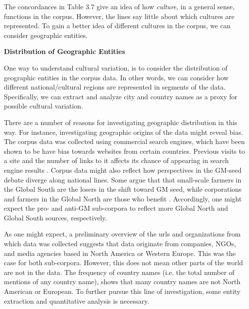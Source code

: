 The concordances in Table 3.7 give an idea of how \textit{culture}, in a general sense, functions in the corpus. However, the lines say little about which cultures are represented. To gain a better idea of different cultures in the corpus, we can consider geographic entities.  

\textbf{Distribution of Geographic Entities}

One way to understand cultural variation, is to consider the distribution of geographic entities in the corpus data. In other words, we can consider how different national/cultural regions are represented in segments of the data. Specifically, we can extract and analyze city and country names as a proxy for possible cultural variation. 

There are a number of reasons for investigating geographic distribution in this way. For instance, investigating geographic origins of the data might reveal bias. The corpus data was collected using commercial search engines, which have been shown to be have bias towards websites from certain countries. Previous visits to a site and the number of links to it affects its chance of appearing in search engine results \citep{Vaughan2013a}. Corpus data might also reflect how perspectives in the GM-seed debate diverge along national lines. Some argue that that small-scale farmers in the Global South are the losers in the shift toward GM seed, while corporations and farmers in the Global North are those who benefit \citep{Parfitt2013a, Nu2009a}. Accordingly, one might expect the pro- and anti-GM sub-corpora to reflect more Global North and Global South sources, respectively.

As one might expect, a preliminary overview of the urls and organizations from which data was collected suggests that data originate from companies, NGOs, and media agencies based in North America or Western Europe. This was the case for both sub-corpora. However, this does not mean other parts of the world are not in the data. The frequency of country names (i.e. the total number of mentions of any country name), shows that many country names are not North American or European. To further pursue this line of investigation, some entity extraction and quantitative analysis is necessary. 

